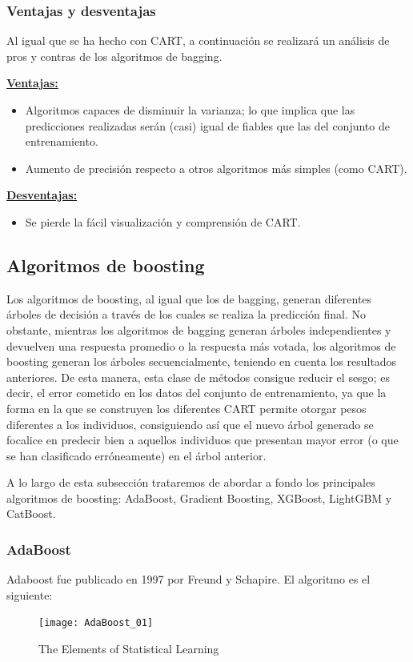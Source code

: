 \documentclass[12pt,twoside]{article}
\begin{document}
\subsubsection{Ventajas y desventajas}
Al igual que se ha hecho con CART, a continuación se realizará un análisis de pros y contras de los algoritmos de bagging.

\textbf{\underline{Ventajas:}}
\begin{itemize}
\item  Algoritmos capaces de disminuir la varianza; lo que implica que las predicciones realizadas serán (casi) igual de fiables que las del conjunto de entrenamiento.
\item Aumento de precisión respecto a otros algoritmos más simples (como CART).
\end{itemize}

\textbf{\underline{Desventajas:}}
\begin{itemize}
\item Se pierde la fácil visualización y comprensión de CART.
\end{itemize}


\newpage
\subsection{Algoritmos de boosting}
Los algoritmos de boosting, al igual que los de bagging, generan diferentes árboles de decisión a través de los cuales se realiza la predicción final. No obstante, mientras los algoritmos de bagging generan árboles independientes y devuelven una respuesta promedio o la respuesta más votada, los algoritmos de boosting generan los árboles secuencialmente, teniendo en cuenta los resultados anteriores. De esta manera, esta clase de métodos consigue reducir el sesgo; es decir, el error cometido en los datos del conjunto de entrenamiento, ya que la forma en la que se construyen los diferentes CART permite otorgar pesos diferentes a los individuos, consiguiendo así que el nuevo árbol generado se focalice en predecir bien a aquellos individuos que presentan mayor error (o que se han clasificado erróneamente) en el árbol anterior.

A lo largo de esta subsección trataremos de abordar a fondo los principales algoritmos de boosting: AdaBoost, Gradient Boosting, XGBoost, LightGBM y CatBoost.


\subsubsection{AdaBoost}
Adaboost fue publicado en 1997 por Freund y Schapire. El algoritmo es el siguiente:
\begin{figure}[h]
\centering
\texttt{[image: AdaBoost\_01]}
\caption{The Elements of Statistical Learning}
\label{fig: AdaBoost_01}
\end{figure}
\end{document}
